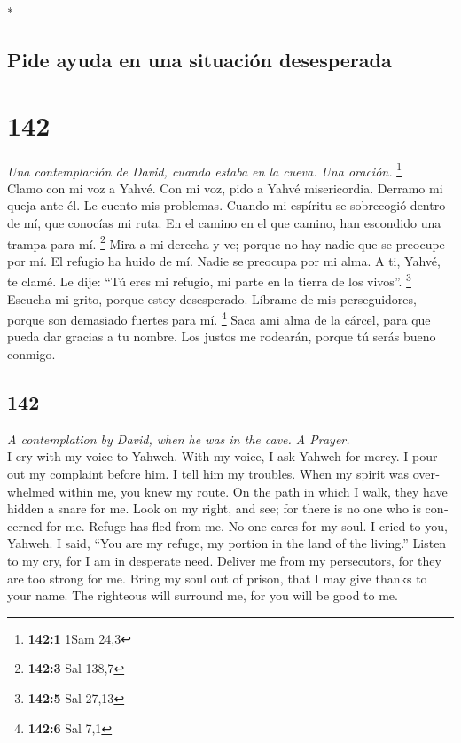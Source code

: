 \begin{paracol}{2}
\begin{otherlanguage}{english}
\end{otherlanguage}

\switchcolumn[0]*

\hypertarget{pide-ayuda-en-una-situaciuxf3n-desesperada}{%
\subsection{Pide ayuda en una situación
desesperada}\label{pide-ayuda-en-una-situaciuxf3n-desesperada}}

\hypertarget{section-282}{%
\section{142}\label{section-282}}

\emph{Una contemplación de David, cuando estaba en la cueva. Una
oración.} \footnote{\textbf{142:1} 1Sam 24,3}\\
 Clamo con mi voz a Yahvé. Con mi voz, pido a Yahvé
misericordia.  Derramo mi queja ante él. Le cuento mis
problemas.  Cuando mi espíritu se sobrecogió dentro de mí,
que conocías mi ruta. En el camino en el que camino, han escondido una
trampa para mí. \footnote{\textbf{142:3} Sal 138,7}  Mira
a mi derecha y ve; porque no hay nadie que se preocupe por mí. El
refugio ha huido de mí. Nadie se preocupa por mi alma.  A
ti, Yahvé, te clamé. Le dije: ``Tú eres mi refugio, mi parte en la
tierra de los vivos''. \footnote{\textbf{142:5} Sal 27,13}
 Escucha mi grito, porque estoy desesperado. Líbrame de
mis perseguidores, porque son demasiado fuertes para mí. \footnote{\textbf{142:6}
  Sal 7,1}  Saca ami alma de la cárcel, para que pueda dar
gracias a tu nombre. Los justos me rodearán, porque tú serás bueno
conmigo.

\switchcolumn
\begin{otherlanguage}{english}

\hypertarget{section-283}{%
\section{142}\label{section-283}}

\emph{A contemplation by David, when he was in the cave. A Prayer.}\\
 I cry with my voice to Yahweh. With my voice, I ask
Yahweh for mercy.  I pour out my complaint before him. I
tell him my troubles.  When my spirit was overwhelmed
within me, you knew my route. On the path in which I walk, they have
hidden a snare for me.  Look on my right, and see; for
there is no one who is concerned for me. Refuge has fled from me. No one
cares for my soul.  I cried to you, Yahweh. I said, ``You
are my refuge, my portion in the land of the living.'' 
Listen to my cry, for I am in desperate need. Deliver me from my
persecutors, for they are too strong for me.  Bring my
soul out of prison, that I may give thanks to your name. The righteous
will surround me, for you will be good to me.


\end{otherlanguage}
\end{paracol}
